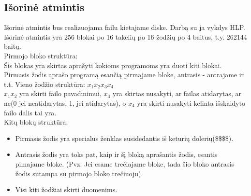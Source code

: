 	\subsection{Išorinė atmintis}
	Išorinė atmintis bus realizuojama failu kietajame diske. Darbą su ja vykdys HLP.\\
	Išorinė atmintis yra 256 blokai po 16 takelių po 16 žodžių po 4 baitus, t.y. 262144 baitų. \\
	Pirmojo bloko struktūra:\\ 
	Šis blokas yra skirtas aprašyti kokioms programoms yra duoti kiti blokai. Pirmasis žodis aprašo programą esančią pirmąjame bloke, antrasis - antrajame ir t.t. Vieno žodžio struktūra: \(x_1x_2x_3x_4\)\\
	\(x_1x_2\) yra skirti failo pavadinimui, \(x_3\) yra skirtas nusakyti, ar failas atidarytas, ar ne(0 jei neatidarytas, 1, jei atidarytas), o \(x_4\) yra skirti nusakyti kelinta išskaidyto failo dalis tai yra.\\
	Kitų blokų struktūra:
	\begin{itemize}
	\item Pirmasis žodis yra specialus ženklas susidedantis iš keturių dolerių(\$\$\$\$).%
	\item Antrasis žodis yra toks pat, kaip ir šį bloką aprašantis žodis, esantis pimajame bloke.%
	(Pvz: Jei esame trečiajame bloke, tada šio bloko antrasis žodis sutampa su pirmojo bloko trečiuoju).
	\item Visi kiti žodžiai skirti duomenims.
	\end{itemize}
\clearpage